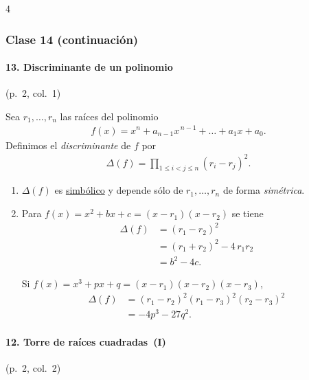\documentclass[landscape,a4paper]{article}
\begin{document}
\begin{multicols}{4}
\subsubsection*{Clase 14 (continuación)}

\paragraph{13. Discriminante de un polinomio}\hfill(p.~2, col.~1)

Sea $r_1,\dots,r_n$ las raíces del polinomio
\begin{align}
f(x)=x^{n}+a_{n-1}x^{\,n-1}+\dots+a_1x+a_0.
\end{align}
Definimos el \emph{discriminante} de $f$ por
\begin{align}
\Delta(f)=\prod_{1\le i<j\le n}(r_i-r_j)^{2}. \tag*{(p.~2, col.~1)}
\end{align}

\begin{enumerate}
\item[\textbf{1)}] $\Delta(f)$ es \underline{simbólico} y depende sólo de $r_1,\dots,r_n$ de forma \emph{simétrica}.\\[-0.25em]

\item[\textbf{2)}] Para $f(x)=x^{2}+bx+c=(x-r_1)(x-r_2)$ se tiene
\begin{align}
\Delta(f)&=(r_1-r_2)^{2} \\[0.3em]
         &=(r_1+r_2)^{2}-4\,r_1r_2 \\[0.3em]
         &=b^{2}-4c.
\end{align}

Si $f(x)=x^{3}+px+q=(x-r_1)(x-r_2)(x-r_3)$,
\begin{align}
\Delta(f)&=(r_1-r_2)^{2}(r_1-r_3)^{2}(r_2-r_3)^{2}\\
         &=-4p^{3}-27q^{2}.
\end{align}
\end{enumerate}

\paragraph{12. Torre de raíces cuadradas (I)}\hfill(p.~2, col.~2)


\end{multicols}
\end{document}

